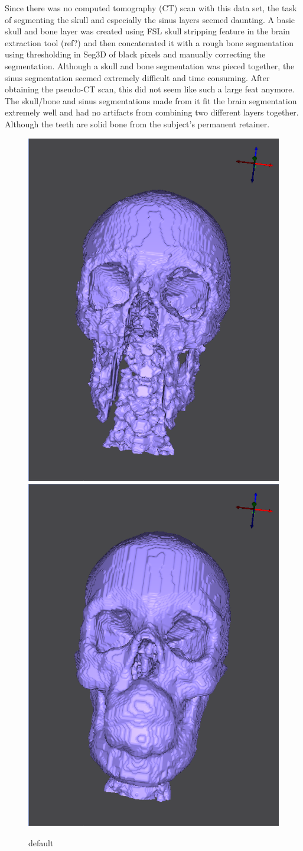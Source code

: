 Since there was no computed tomography (CT) scan with this data set, the task of segmenting the skull and especially the sinus layers seemed daunting. A basic skull and bone layer was created using FSL skull stripping feature in the brain extraction tool (ref?) and then concatenated it with a rough bone segmentation using thresholding in Seg3D of black pixels and manually correcting the segmentation. Although a skull and bone segmentation was pieced together, the sinus segmentation seemed extremely difficult and time consuming. After obtaining the pseudo-CT scan, this did not seem like such a large feat anymore. The skull/bone and sinus segmentations made from it fit the brain segmentation extremely well and had no artifacts from combining two different layers together. Although the teeth are solid bone from the subject's permanent retainer.

\begin{figure}[H]
\begin{center}
\includegraphics[width=.49\textwidth]{Figures/skull_before}
\includegraphics[width=.49\textwidth]{Figures/skull_after}
\caption{default}
\label{default}
\end{center}
\end{figure}

